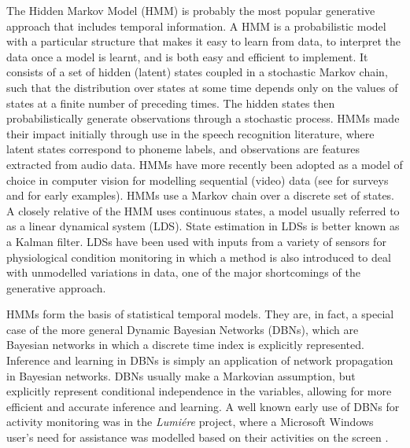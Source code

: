 The Hidden Markov Model (HMM) is probably the most popular generative approach that includes temporal information. A HMM is a probabilistic model with a particular structure that makes it easy to learn from data, to interpret the data once a model is learnt, and is both easy and efficient to implement. It consists of a set of hidden (latent) states coupled in a stochastic Markov chain, such that the distribution over states at some time depends only on the values of states at a finite number of preceding times. The hidden states then probabilistically generate observations through a stochastic process. HMMs made their impact initially through use in the speech recognition literature, where latent states correspond to phoneme labels, and observations are features extracted from audio data. HMMs have more recently been adopted as a model of choice in computer vision for modelling sequential (video) data (see \cite{Gavrila1999} \cite{Moeslund2006} for surveys and \cite{Galata1999} \cite{Starner1995} for early examples). HMMs use a Markov chain over a discrete set of states. A closely relative of the HMM uses continuous states, a model usually referred to as a linear dynamical system (LDS). State estimation in LDSs is better known as a Kalman filter. LDSs have been used with inputs from a variety of sensors for physiological condition monitoring \cite{Quinn2009} in which a method is also introduced to deal with unmodelled variations in data, one of the major shortcomings of the generative approach.

HMMs form the basis of statistical temporal models. They are, in fact, a special case of the more general Dynamic Bayesian Networks (DBNs), which are Bayesian networks in which a discrete time index is explicitly represented. Inference and learning in DBNs is simply an application of network propagation in Bayesian networks. DBNs usually make a Markovian assumption, but explicitly represent conditional independence in the variables, allowing for more efficient and accurate inference and learning. A well known early use of DBNs for activity monitoring was in the \textit{Lumi\'ere} project, where a Microsoft Windows user’s need for assistance was modelled based on their activities on the screen \cite{Horvitz1998}.

